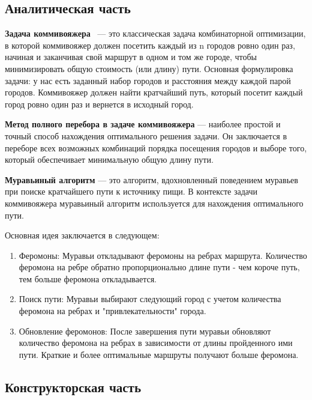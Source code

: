 \documentclass[12pt, a4paper]{article}
\begin{document}
\newpage
\begin{center}
   \section{Аналитическая часть} 
\end{center}

\textbf{Задача коммивояжера}~\cite{book} --- это классическая задача комбинаторной оптимизации, в которой коммивояжер должен посетить каждый из n городов ровно один раз, начиная и заканчивая свой маршрут в одном и том же городе, чтобы минимизировать общую стоимость (или длину) пути. Основная формулировка задачи: у нас есть заданный набор городов и расстояния между каждой парой городов. Коммивояжер должен найти кратчайший путь, который посетит каждый город ровно один раз и вернется в исходный город.

\textbf{Метод полного перебора в задаче коммивояжера} --- наиболее простой и точный способ нахождения оптимального решения задачи. Он заключается в переборе всех возможных комбинаций порядка посещения городов и выборе того, который обеспечивает минимальную общую длину пути.


\textbf{Муравьиный алгоритм} --- это алгоритм, вдохновленный поведением муравьев при поиске кратчайшего пути к источнику пищи. В контексте задачи коммивояжера муравьиный алгоритм используется для нахождения оптимального пути.

Основная идея заключается в следующем:
\begin{enumerate}
    \item Феромоны: Муравьи откладывают феромоны на ребрах маршрута. Количество феромона на ребре обратно пропорционально длине пути - чем короче путь, тем больше феромона откладывается.
    \item Поиск пути: Муравьи выбирают следующий город с учетом количества феромона на ребрах и "привлекательности" города.
    \item Обновление феромонов: После завершения пути муравьи обновляют количество феромона на ребрах в зависимости от длины пройденного ими пути. Краткие и более оптимальные маршруты получают больше феромона.
\end{enumerate}

\newpage
\begin{center}
    \section{Конструкторская часть}
\end{center}
\end{document}
